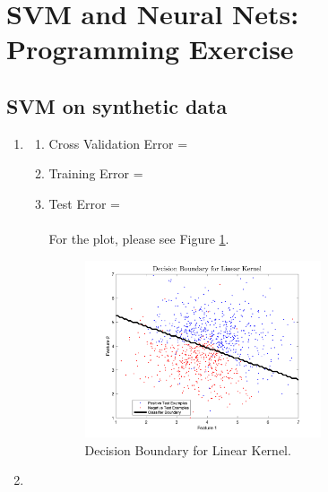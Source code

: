 \documentclass[english]{article}
\begin{document}
\section{SVM and Neural Nets: Programming Exercise}
\subsection{SVM on synthetic data}
\begin{enumerate}
\item
\begin{enumerate}
\item Cross Validation Error = 
\item Training Error = 
\item Test Error = \\\\
For the plot, please see Figure \ref{fig:411}.\\
        \begin{figure}[H]
          \centering
          \includegraphics[width=0.7\textwidth]{LinearKernel.png}
          \caption{Decision Boundary for Linear Kernel.}
          \label{fig:411}
        \end{figure}
\end{enumerate}
\clearpage
\item 
\begin{enumerate}


\end{enumerate}
\end{enumerate}
\end{document}
